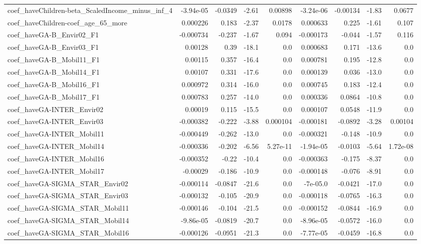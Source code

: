 \begin{tabular}{lrrrrrrrr}
coef_haveChildren-beta_ScaledIncome_minus_inf_4 & -3.94e-05 & -0.0349 & -2.61 & 0.00898 & -3.24e-06 & -0.00134 & -1.83 & 0.0677 \\
coef_haveChildren-coef_age_65_more & 0.000226 & 0.183 & -2.37 & 0.0178 & 0.000633 & 0.225 & -1.61 & 0.107 \\
coef_haveGA-B_Envir02_F1 & -0.000734 & -0.237 & -1.67 & 0.094 & -0.000173 & -0.044 & -1.57 & 0.116 \\
coef_haveGA-B_Envir03_F1 & 0.00128 & 0.39 & -18.1 & 0.0 & 0.000683 & 0.171 & -13.6 & 0.0 \\
coef_haveGA-B_Mobil11_F1 & 0.00115 & 0.357 & -16.4 & 0.0 & 0.000781 & 0.195 & -12.8 & 0.0 \\
coef_haveGA-B_Mobil14_F1 & 0.00107 & 0.331 & -17.6 & 0.0 & 0.000139 & 0.036 & -13.0 & 0.0 \\
coef_haveGA-B_Mobil16_F1 & 0.000972 & 0.314 & -16.0 & 0.0 & 0.000745 & 0.183 & -12.4 & 0.0 \\
coef_haveGA-B_Mobil17_F1 & 0.000783 & 0.257 & -14.0 & 0.0 & 0.000336 & 0.0864 & -10.8 & 0.0 \\
coef_haveGA-INTER_Envir02 & 0.00019 & 0.115 & -15.5 & 0.0 & 0.000107 & 0.0548 & -11.9 & 0.0 \\
coef_haveGA-INTER_Envir03 & -0.000382 & -0.222 & -3.88 & 0.000104 & -0.000181 & -0.0892 & -3.28 & 0.00104 \\
coef_haveGA-INTER_Mobil11 & -0.000449 & -0.262 & -13.0 & 0.0 & -0.000321 & -0.148 & -10.9 & 0.0 \\
coef_haveGA-INTER_Mobil14 & -0.000336 & -0.202 & -6.56 & 5.27e-11 & -1.94e-05 & -0.0103 & -5.64 & 1.72e-08 \\
coef_haveGA-INTER_Mobil16 & -0.000352 & -0.22 & -10.4 & 0.0 & -0.000363 & -0.175 & -8.37 & 0.0 \\
coef_haveGA-INTER_Mobil17 & -0.00029 & -0.186 & -10.9 & 0.0 & -0.000148 & -0.076 & -8.91 & 0.0 \\
coef_haveGA-SIGMA_STAR_Envir02 & -0.000114 & -0.0847 & -21.6 & 0.0 & -7e-05.0 & -0.0421 & -17.0 & 0.0 \\
coef_haveGA-SIGMA_STAR_Envir03 & -0.000132 & -0.105 & -20.9 & 0.0 & -0.000118 & -0.0765 & -16.3 & 0.0 \\
coef_haveGA-SIGMA_STAR_Mobil11 & -0.000146 & -0.104 & -21.5 & 0.0 & -0.000152 & -0.0844 & -16.9 & 0.0 \\
coef_haveGA-SIGMA_STAR_Mobil14 & -9.86e-05 & -0.0819 & -20.7 & 0.0 & -8.96e-05 & -0.0572 & -16.0 & 0.0 \\
coef_haveGA-SIGMA_STAR_Mobil16 & -0.000126 & -0.0951 & -21.3 & 0.0 & -7.77e-05 & -0.0459 & -16.8 & 0.0 \\

\end{tabular}
